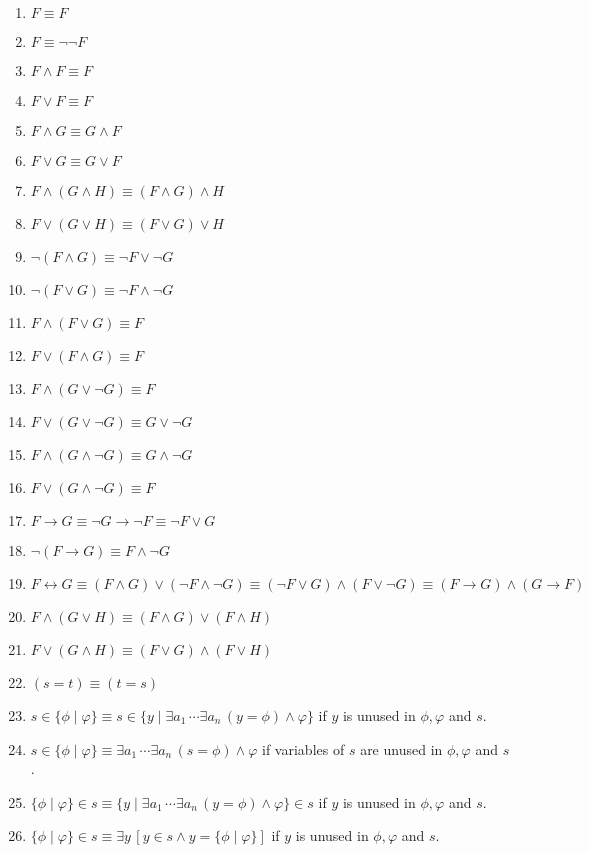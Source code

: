\documentclass[11pt]{book}
\newcommand{\env}[2]{\begin{#1}#2\end{#1}}
\begin{document}
\env{enumerate}{
	\item $F\equiv F$
	\item $F\equiv \neg\neg F$
	\item $F\land F\equiv F$
	\item $F\lor F\equiv F$
	\item $F\land G\equiv G\land F$
	\item $F\lor G\equiv G\lor F$
	\item $F\land (G\land H)\equiv (F\land G)\land H$
	\item $F\lor (G\lor H)\equiv (F\lor G)\lor H$
	\item $\neg (F\land G)\equiv \neg F\lor \neg  G$
	\item $\neg (F\lor G)\equiv \neg F\land \neg  G$
	\item $F\land (F\lor G)\equiv F$
	\item $F\lor (F\land G)\equiv F$
	\item $F\land (G\lor \neg G)\equiv F$
	\item $F\lor (G\lor \neg G)\equiv G\lor \neg G$
	\item $F\land (G\land \neg G)\equiv G\land \neg G$
	\item $F\lor (G\land \neg G)\equiv F$
	\item $F\rightarrow G\equiv \neg G\rightarrow \neg F\equiv \neg F\lor G$
	\item $\neg (F\rightarrow G)\equiv F\land \neg G$
	\item $F\leftrightarrow G\equiv (F\land G)\lor (\neg F\land \neg G)\equiv (\neg F\lor G)\land (F\lor \neg G)\equiv (F\rightarrow G)\land (G\rightarrow F)$
	\item $F\land (G\lor H)\equiv (F\land G)\lor (F\land H)$
	\item $F\lor (G\land H)\equiv (F\lor G)\land (F\lor H)$
	\item $(s=t)\equiv (t=s)$
	
	\item $s\in\{\phi\mid \varphi\}\equiv s\in\{y\mid \exists a_1\,\cdots\exists a_n\,(y=\phi)\land \varphi\}$ if $y$ is unused in $\phi,\varphi$ and $s$.
	\item $s\in\{\phi\mid \varphi\}\equiv \exists a_1\,\cdots\exists a_n\,(s=\phi)\land \varphi$ if variables of $s$ are unused in $\phi,\varphi$ and $s$.
	\item $\{\phi\mid \varphi\}\in s\equiv \{y\mid \exists a_1\,\cdots\exists a_n\,(y=\phi)\land \varphi\}\in s$ if $y$ is unused in $\phi,\varphi$ and $s$.
	\item $\{\phi\mid \varphi\}\in s\equiv \exists y\,[y\in s\land y=\{\phi\mid\varphi\}]$ if $y$ is unused in $\phi,\varphi$ and $s$.
}
\end{document}
